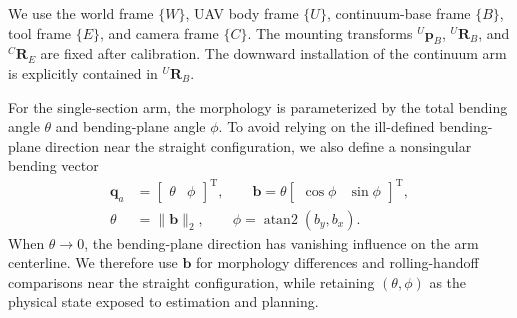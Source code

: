 \documentclass[journal,twoside]{IEEEtran}
\begin{document}
We use the world frame $\{W\}$, UAV body frame $\{U\}$, continuum-base frame $\{B\}$, tool frame $\{E\}$, and camera frame $\{C\}$. The mounting transforms ${}^{U}\mathbf p_B$, ${}^{U}\mathbf R_B$, and ${}^{C}\mathbf R_E$ are fixed after calibration. The downward installation of the continuum arm is explicitly contained in ${}^{U}\mathbf R_B$.

For the single-section arm, the morphology is parameterized by the total bending angle $\theta$ and bending-plane angle $\phi$. To avoid relying on the ill-defined bending-plane direction near the straight configuration, we also define a nonsingular bending vector
\begin{equation}
\begin{aligned}
\mathbf q_a&=\begin{bmatrix}\theta&\phi\end{bmatrix}^{\!\mathrm T},\qquad
\mathbf b=\theta\begin{bmatrix}\cos\phi&\sin\phi\end{bmatrix}^{\!\mathrm T},\\
\theta&=\|\mathbf b\|_2,\qquad
\phi=\operatorname{atan2}(b_y,b_x).
\end{aligned}
\label{eq:morphology_state}
\end{equation}
When $\theta\rightarrow 0$, the bending-plane direction has vanishing influence on the arm centerline. We therefore use $\mathbf b$ for morphology differences and rolling-handoff comparisons near the straight configuration, while retaining $(\theta,\phi)$ as the physical state exposed to estimation and planning.
\end{document}
